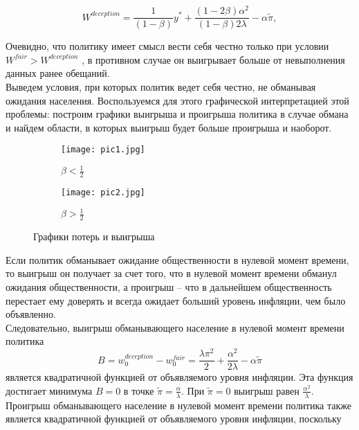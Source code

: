 \begin{equation}
W^{deception} = \frac{1}{(1-\beta)}y^*+\frac{(1-2\beta)\alpha^2}{(1-\beta)2\lambda}-\alpha\tilde{\pi},
\end{equation}

Очевидно, что политику имеет смысл вести себя честно только при условии $W^{fair} > W^{deception}$ , в противном случае он выигрывает больше от невыполнения данных ранее обещаний.
\\

Выведем условия, при которых политик ведет себя честно, не обманывая ожидания населения. Воспользуемся для этого графической интерпретацией этой проблемы: построим графики выигрыша и проигрыша политика в случае обмана и найдем области, в которых выигрыш будет больше проигрыша и наоборот.

\begin{figure}[h]
	
	\begin{subfigure}{0.5\textwidth}
		\texttt{[image: pic1.jpg]} 
		\caption{$\beta < \frac{1}{2}$}
		\label{fig:pic1}
	\end{subfigure}
	\begin{subfigure}{0.5\textwidth}
		\texttt{[image: pic2.jpg]}
		\caption{$\beta > \frac{1}{2}$}
		\label{fig:pic2}
	\end{subfigure}
	
	\caption{Графики потерь и выигрыша}
	\label{fig:image2}
\end{figure}

Если политик обманывает ожидание общественности в нулевой момент времени, то выигрыш он получает за счет того, что в нулевой момент времени обманул ожидания общественности, а проигрыш – что в дальнейшем общественность перестает ему доверять и всегда ожидает больший уровень инфляции, чем было объявленно.
\\

Следовательно, выигрыш обманывающего население в нулевой момент времени политика
\begin{equation}
B=w^{deception}_0 - w^{fair}_0 = \frac{\lambda\pi^2}{2}+\frac{\alpha^2}{2\lambda}-\alpha\tilde{\pi}
\end{equation}
является квадратичной функцией от объявляемого уровня инфляции. Эта функция достигает минимума $B=0$  в точке $\tilde{\pi}=\frac{\alpha}{\lambda}$. При $\tilde{\pi}=0$  выигрыш равен $\frac{\alpha^2}{\lambda}$.
\\

Проигрыш обманывающего население в нулевой момент времени политика также является квадратичной функцией от объявляемого уровня инфляции, поскольку

